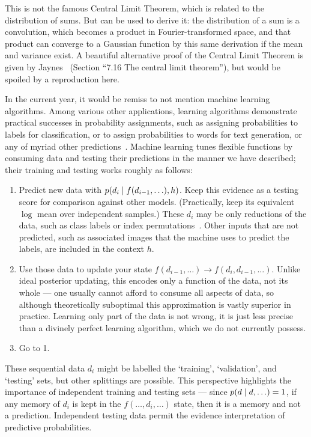 This is not the famous Central Limit Theorem, which is related to the
distribution of sums.
But can be used to derive it: the distribution of a sum is a convolution, which
becomes a product in Fourier-transformed space, and that product can converge
to a Gaussian function by this same derivation if the mean and variance exist.
A beautiful alternative proof of the Central Limit Theorem is given by
Jaynes~\cite{jaynes2003probability}
(Section ``7.16 The central limit theorem''), but would be spoiled by a
reproduction here.

In the current year, it would be remiss to not mention machine learning
algorithms.
Among various other applications, learning algorithms demonstrate practical
successes in probability assignments, such as assigning
probabilities to labels for classification,
or to assign probabilities to words for text
generation, or any of myriad other
predictions~\cite{MurphyKevinP.2012Mlap, radford2019language}.
Machine learning tunes flexible functions by consuming data and testing their
predictions in the manner we have described; their training and testing works
roughly as follows:
\begin{enumerate}
\item Predict new data with $p(d_i \mid f(d_{i-1}, \ldots), h)$.
Keep this evidence as a testing score for comparison against other models.
(Practically, keep its equivalent $\log$ mean over independent samples.)
These $d_i$ may be only reductions of the data, such as class labels
or index permutations~\cite{Noroozi2016jigsaw, multitaskself2017}.
Other inputs that are not predicted, such as associated images that the machine
uses to predict the labels, are included in the context $h$.
\item Use those data to update your state
$f(d_{i-1}, \ldots) \to f(d_i, d_{i-1}, \ldots)$.
Unlike ideal posterior updating, this encodes only a function of the data, not
its whole --- one usually cannot afford to consume all aspects of data, so
although theoretically suboptimal this approximation is vastly superior in
practice.
Learning only part of the data is not wrong, it is just less precise than a
divinely perfect learning algorithm, which we do not currently possess.
\item Go to 1.
\end{enumerate}
These sequential data $d_i$ might be labelled the `training', `validation',
and `testing' sets, but other splittings are possible.
This perspective highlights the importance of independent training and testing
sets --- since $p(d \mid d, \ldots) = 1$, if any memory of $d_i$ is kept in
the $f(\ldots, d_i, \ldots)$ state, then it is a memory and not a prediction.
Independent testing data permit the evidence interpretation of predictive
probabilities.


